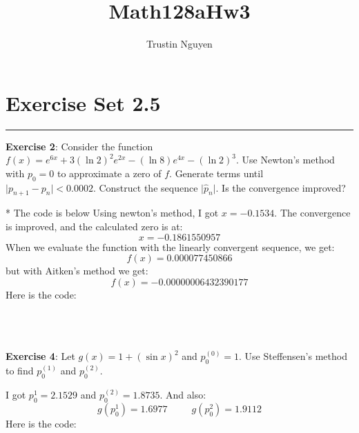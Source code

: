 \documentclass{article}
\title{Math128aHw3}
\author{Trustin Nguyen}
\begin{document}
    \maketitle

\reversemarginpar

\section*{Exercise Set 2.5}
\hrule

\textbf{Exercise 2}: Consider the function $f(x) = e^{6x} + 3(\ln{2})^{2}e^{2x} - (\ln{8})e^{4x} - (\ln{2})^{3}$. Use Newton's method with $p_{0} = 0$ to approximate a zero of $f$. Generate terms until $\lvert p_{n + 1} - p_{n} \rvert < 0.0002$. Construct the sequence $\lvert \hat{p}_{n} \rvert$. Is the convergence improved?
    \begin{answer}
        * The code is below
        Using newton's method, I got $x = -0.1534$. The convergence is improved, and the calculated zero is at:
            \begin{equation*}
                x = -0.1861550957
            \end{equation*}
        When we evaluate the function with the linearly convergent sequence, we get:
            \begin{equation*}
                f(x) =  0.000077450866
            \end{equation*}
        but with Aitken's method we get:
            \begin{equation*}
                f(x) = -0.00000006432390177
            \end{equation*}
        Here is the code:
        \inputminted{matlab}{code/newton/newton.m}
        \inputminted{matlab}{code/Aitken.m}
        \inputminted{matlab}{code/myfunc1.m}
        \inputminted{matlab}{code/script1.m}
    \end{answer}

\textbf{Exercise 4}: Let $g(x) = 1 + (\sin{x})^{2}$ and $p_{0}^{(0)} = 1$. Use Steffensen's method to find $p_{0}^{(1)}$ and $p_{0}^{(2)}$.
    \begin{answer}
        I got $p_{0}^{1} = 2.1529$ and $p_{0}^{(2)} = 1.8735$. And also:
            \begin{equation*}
                g(p_{0}^{1}) = 1.6977 \hspace{30pt} g(p_{0}^{2}) = 1.9112
            \end{equation*}
        Here is the code:
        \inputminted{matlab}{code/steffensen/steffensen.m}
        \inputminted{matlab}{code/Aitken.m}
        \inputminted{matlab}{code/myfunc2.m}
        \inputminted{matlab}{code/script2.m}
    \end{answer}
\end{document}
